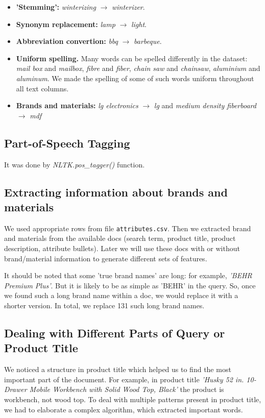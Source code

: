 \documentclass[12pt]{article}
\begin{document}
\begin{itemize}
\item \textbf{'Stemming':} \emph{winterizing}	$\rightarrow$ \emph{winterizer}.
\item \textbf{Synonym replacement:} \emph{lamp}	$\rightarrow$ \emph{light}.
\item \textbf{Abbreviation convertion:} \emph{bbq}	$\rightarrow$ \emph{barbeque}.
\item \textbf{Uniform spelling.} Many words can be spelled differently in the dataset: \emph{mail box} and \emph{mailbox}, \emph{fibre} and \emph{fiber}, \emph{chain saw} and \emph{chainsaw}, \emph{aluminium} and \emph{aluminum}. We made the spelling of some of such words uniform throughout all text columns.
\item \textbf{Brands and materials:} \emph{lg electronics} $\rightarrow$    \emph{lg} and  \emph{medium density fiberboard}  $\rightarrow$  \emph{mdf}
\end{itemize}



\subsection{Part-of-Speech Tagging}
It was done by \emph{NLTK.pos\_tagger()} function.

\subsection{Extracting information about brands and materials}
We used appropriate rows from file \texttt{attributes.csv}. Then we extracted brand and materials from the available docs (search term, product title, product description, attribute bullets). Later we will use these docs with or without brand/material information to generate different sets of features.

It should be noted that some 'true brand names' are long: for example, \emph{'BEHR Premium Plus'}. But it is likely to be as simple as 'BEHR' in the query. So, once we found such a long brand name within a doc, we would replace it with a shorter version. In total, we replace 131 such long brand names.

\subsection{Dealing with Different Parts of Query or Product Title}
We noticed a structure in product title which helped us to find the most important part of the document. For example, in product title \emph{'Husky 52 in. 10-Drawer Mobile Workbench with Solid Wood Top, Black'} the product is workbench, not wood top. To deal with multiple patterns present in product title, we had to elaborate a complex algorithm, which extracted important words.
\end{document}
